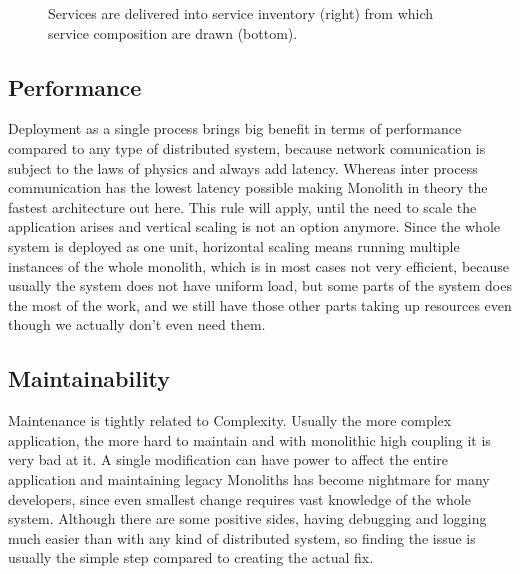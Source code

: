 \begin{figure}
    \centering
    
    \caption{Services are delivered into service inventory (right) from which service composition are drawn (bottom). \label{img:soa_architecture}}
\end{figure}



\subsection{Performance}
\label{section:monolith:performance}
Deployment as a single process brings big benefit in terms of performance compared to any type of distributed system, because network comunication is subject to the laws of physics and always add latency. Whereas inter process communication has the lowest latency possible making Monolith in theory the fastest architecture out here. This rule will apply, until the need to scale the application arises and vertical scaling is not an option anymore. Since the whole system is deployed as one unit, horizontal scaling means running multiple instances of the whole monolith, which is in most cases not very efficient, because usually the system does not have uniform load, but some parts of the system does the most of the work, and we still have those other parts taking up resources even though we actually don't even need them.


% 

\subsection{Maintainability}
Maintenance is tightly related to Complexity. Usually the more complex application, the more hard to maintain and with monolithic high coupling it is very bad at it. A single modification can have power to affect the entire application and maintaining legacy Monoliths has become nightmare for many developers, since even smallest change requires vast knowledge of the whole system. Although there are some positive sides, having debugging and logging much easier than with any kind of distributed system, so finding the issue is usually the simple step compared to creating the actual fix.


